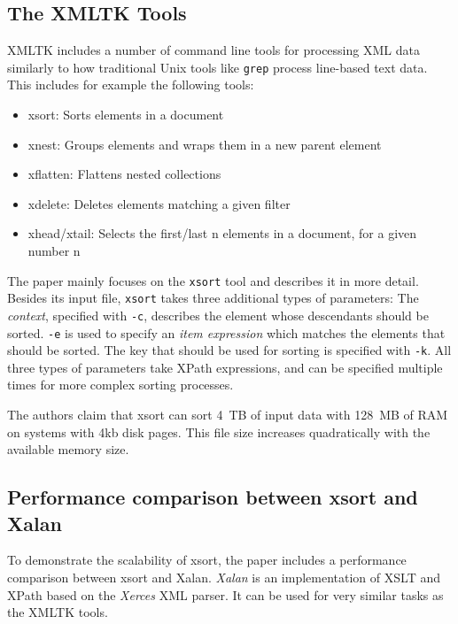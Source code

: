 \documentclass[sigconf,nonacm]{acmart}
\begin{document}
\subsection{The XMLTK Tools}

XMLTK includes a number of command line tools for processing XML data similarly to how traditional Unix tools like \lstinline{grep} process line-based text data. This includes for example the following tools:

\begin{itemize}
  \item[xsort:] Sorts elements in a document
  \item[xnest:] Groups elements and wraps them in a new parent element
  \item[xflatten:] Flattens nested collections
  \item[xdelete:] Deletes elements matching a given filter
  \item[xhead/xtail:] Selects the first/last n elements in a document, for a given number n
\end{itemize}

The paper mainly focuses on the \lstinline{xsort} tool and describes it in more detail. Besides its input file, \lstinline{xsort} takes three additional types of parameters: The \emph{context}, specified with \lstinline{-c}, describes the element whose descendants should be sorted. \lstinline{-e} is used to specify an \emph{item expression} which matches the elements that should be sorted. The key that should be used for sorting is specified with \lstinline{-k}. All three types of parameters take XPath expressions, and can be specified multiple times for more complex sorting processes.


The authors claim that xsort can sort 4 TB of input data with 128 MB of RAM on systems with 4kb disk pages. This file size increases quadratically with the available memory size.


\subsection{Performance comparison between xsort and Xalan}
\label{subsec:original-experiment}

To demonstrate the scalability of xsort, the paper includes a performance comparison between xsort and Xalan. \emph{Xalan}\cite{Xalan} is an implementation of XSLT and XPath based on the \emph{Xerces} XML parser. It can be used for very similar tasks as the XMLTK tools.
\end{document}
